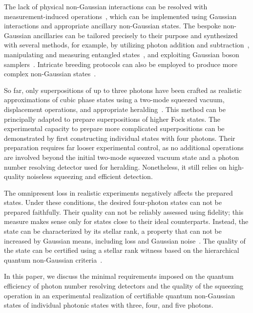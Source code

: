 \documentclass{article}
\begin{document}
The lack of physical non-Gaussian interactions can be resolved with measurement-induced operations~\cite{filip2005,marek2009,marek2011,yukawa2013b,miyata2016,marek2018a,sakaguchi2023}, which can be implemented using Gaussian interactions and appropriate ancillary non-Gaussian states. The bespoke non-Gaussian ancillaries can be tailored precisely to their purpose and synthesized with several methods, for example, by utilizing photon addition and subtraction~\cite{dakna1999,fiurasek2005,eaton2019,takase2021,endo2023}, manipulating and measuring entangled states~\cite{yukawa2013a,yoshikawa2018,tiedau2019,provaznik2020}, and exploiting Gaussian boson samplers~\cite{su2019,quesada2019}. Intricate breeding protocols can also be employed to produce more complex non-Gaussian states~\cite{weigand2018,eaton2022,zheng2023,takase2024,aghaeerad2025}. %

So far, only superpositions of up to three photons have been crafted as realistic approximations of cubic phase states using a two-mode squeezed vacuum, displacement operations, and appropriate heralding~\cite{yukawa2013a,yukawa2013b}. This method can be principally adapted to prepare superpositions of higher Fock states. The experimental capacity to prepare more complicated superpositions can be demonstrated by first constructing individual states with four photons. Their preparation requires far looser experimental control, as no additional operations are involved beyond the initial two-mode squeezed vacuum state and a photon number resolving detector used for heralding. Nonetheless, it still relies on high-quality noiseless squeezing and efficient detection.

The omnipresent loss in realistic experiments negatively affects the prepared states. Under these conditions, the desired four-photon states can not be prepared faithfully. Their quality can not be reliably assessed using fidelity; this measure makes sense only for states close to their ideal counterparts. Instead, the state can be characterized by its stellar rank, a property that can not be increased by Gaussian means, including loss and Gaussian noise~\cite{walschaers2021}. The quality of the state can be certified using a stellar rank witness based on the hierarchical quantum non-Gaussian criteria~\cite{lachman2019,fiurasek2022}.

In this paper, we discuss the minimal requirements imposed on the quantum efficiency of photon number resolving detectors and the quality of the squeezing operation in an experimental realization of certifiable quantum non-Gaussian states of individual photonic states with three, four, and five photons.
\end{document}
